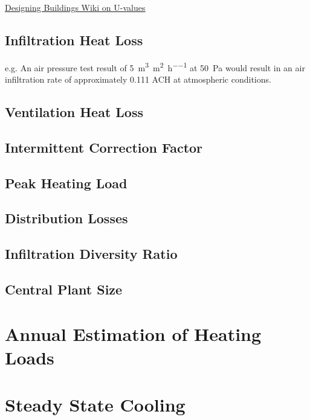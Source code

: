 {\href{https://www.designingbuildings.co.uk/wiki/U-values}{\underline{Designing Buildings Wiki on U-values}}

\subsection{Infiltration Heat Loss}

e.g. An air pressure test result of \SI{5}{\cubic\metre\per\square\metre\per\hour} at \SI{50}{\pascal} would result in an air infiltration rate of approximately 0.111 ACH at atmospheric conditions.

\subsection{Ventilation Heat Loss}



\subsection{Intermittent Correction Factor}



\subsection{Peak Heating Load}



\subsection{Distribution Losses}



\subsection{Infiltration Diversity Ratio}



\subsection{Central Plant Size}



\section{Annual Estimation of Heating Loads}



\section{Steady State Cooling}
\label{sec:HCSSCooling}

}
